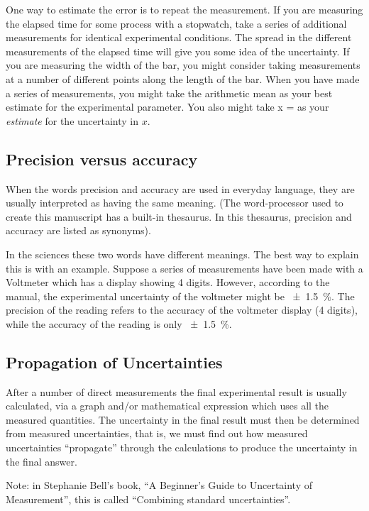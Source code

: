 One way to estimate the error is to repeat the measurement. If you are measuring the elapsed time for some process with a stopwatch, take a series of additional measurements for identical experimental conditions. The spread in the different measurements of the elapsed time will give you some idea of the uncertainty. If you are measuring the width of the bar, you might consider taking measurements at a number of different points along the length of the bar. When you have made a series of measurements, you might take the arithmetic mean as your best estimate for the experimental parameter. You also might take
\beq
\dx x = 
\eeq
as your \emph{estimate} for the uncertainty in $x$.


\subsection{Precision versus accuracy}
When the words precision and accuracy are used in everyday language, they are usually interpreted as having the same meaning. (The word-processor used to create this manuscript has a built-in thesaurus. In this thesaurus, precision and accuracy are listed as synonyms).

In the sciences these two words have different meanings. The best way to explain this is with an example. Suppose a series of measurements have been made with a Voltmeter which has a display showing 4 digits. However, according to the manual, the experimental uncertainty of the voltmeter might be \SI{+-1.5}{\%}. The precision of the reading refers to the accuracy of the voltmeter display (4 digits), while the accuracy of the reading is only \SI{+-1.5}{\%}.


\subsection{Propagation of Uncertainties}
After a number of direct measurements the final experimental result is usually calculated, via a graph and/or mathematical expression which uses all the measured quantities. The uncertainty in the final result must then be determined from measured uncertainties, that is, we must find out how measured uncertainties ``propagate'' through the calculations to produce the uncertainty in the final answer.

Note: in Stephanie Bell's book, ``A Beginner's Guide to Uncertainty of Measurement'', this is called ``Combining standard uncertainties''.


